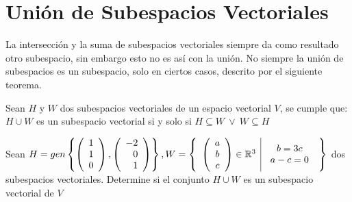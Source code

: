 \newpage

\section{Unión de Subespacios Vectoriales}
La intersección y la suma de subespacios vectoriales siempre da como resultado otro subespacio, sin embargo esto no es así con la unión. No siempre la unión de subespacios es un subespacio, solo en ciertos casos, descrito por el siguiente teorema.
\begin{theorem}
Sean $H$ y $W$ dos subespacios vectoriales de un espacio vectorial $V$, se cumple que: $H \cup W$ es un subespacio vectorial si y solo si $H \subseteq W \ \lor \ W \subseteq H$
\end{theorem}

\begin{ejemplo}
Sean $H = gen \left\{\left( \begin{array}{r} 1\\ 1\\ 0 \end{array} \right) ,\left( \begin{array}{r} -2\\ 0\\ 1 \end{array} \right)  \right\} , W= \left\{\begin{array}{c|c} {\left( \begin{array}{c} a\\ b\\ c \end{array}\right) \in \mathbb{R}^3 }&{\begin{array}{c}
    b = 3c\\
    a-c=0
\end{array}} \end{array} \right\}$ dos subespacios vectoriales. Determine si el conjunto $H \cup W$ es un subespacio vectorial de $V$
\end{ejemplo}
